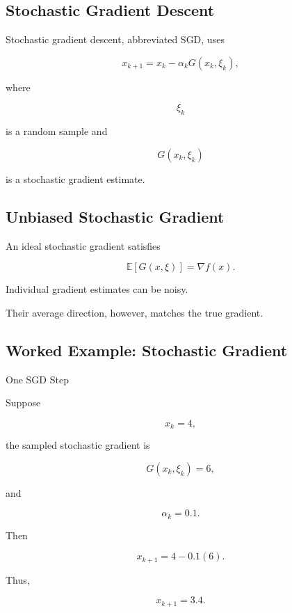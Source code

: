 \subsection{Stochastic Gradient Descent}
\label{subsec:stochastic-gradient-descent}

Stochastic gradient descent, abbreviated SGD, uses

\[
\boxed{
x_{k+1}
=
x_k
-
\alpha_k
G(x_k,\xi_k),
}
\]

where

\[
\xi_k
\]

is a random sample and

\[
G(x_k,\xi_k)
\]

is a stochastic gradient estimate.

\subsection{Unbiased Stochastic Gradient}
\label{subsec:unbiased-stochastic-gradient}

An ideal stochastic gradient satisfies

\[
\boxed{
\mathbb{E}
[
G(x,\xi)
]
=
\nabla f(x).
}
\]

Individual gradient estimates can be noisy.

Their average direction, however, matches the true gradient.

\subsection{Worked Example: Stochastic Gradient}
\label{subsec:worked-stochastic-gradient}

\begin{workedexamplebox}{One SGD Step}

Suppose

\[
x_k=4,
\]

the sampled stochastic gradient is

\[
G(x_k,\xi_k)=6,
\]

and

\[
\alpha_k=0.1.
\]

Then

\[
x_{k+1}
=
4-0.1(6).
\]

Thus,

\begin{answerbox}
\[
\boxed{
x_{k+1}=3.4.
}
\]
\end{answerbox}

\end{workedexamplebox}

